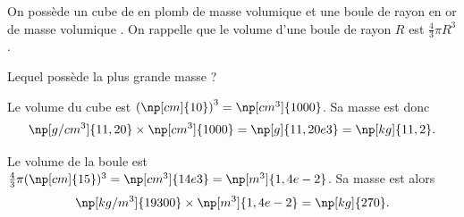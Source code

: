 


\finEntrainement






\hauteurLargeurCadreReponse		{8mm}{3cm}
\initialisationEntrainement

On possède un cube de  en plomb de masse volumique  et une boule de rayon  en or de masse volumique . On rappelle que le volume d'une boule de rayon $R$ est $\frac{4}{3}\pi R^3$.


\debutEntrainement



\begin{enonce}
Lequel possède la plus grande masse ?
\end{enonce}


\begin{corrige}
Le volume du cube est $\left(\np[cm]{10} \right)^3 = \np[cm^3]{1000}$. Sa masse est donc 
\[
\np[g/cm^3]{11,20} \times \np[cm^3]{1000} = \np[g]{11,20e3} = \np[kg]{11,2}.
\] 

Le volume de la boule est $\frac{4}{3}\pi (\np[cm]{15})^3 = \np[cm^3]{14e3} =  \np[m^3]{1,4e-2}$. Sa masse est alors 
\[
\np[kg/m^3]{19300} \times \np[m^3]{1,4e-2} = \np[kg]{270}.
\]
\end{corrige}


